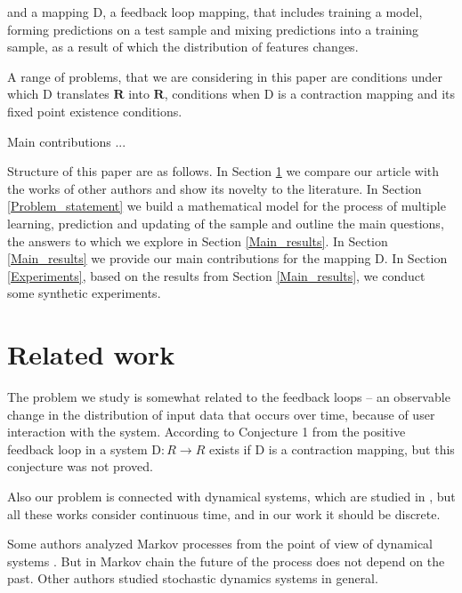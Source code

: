 \documentclass{article}
\begin{document}
    and a mapping $\text{D}$, a feedback loop mapping, that includes training a model, forming predictions on a test sample and mixing predictions into a training sample, as a result of which the distribution of features changes.

    A range of problems, that we are considering in this paper are conditions under which $\text{D}$ translates $\mathbf{R}$ into $\mathbf{R}$, conditions when $\text{D}$ is a contraction mapping and its fixed point existence conditions.

    Main contributions ...
    
    Structure of this paper are as follows. In Section \ref{Related_work} we compare our article with the works of other authors and show its novelty to the literature. In Section \ref{Problem_statement} we build a mathematical model for the process of multiple learning, prediction and updating of the sample and outline the main questions, the answers to which we explore in Section \ref{Main_results}. In Section \ref{Main_results} we provide our main contributions for the mapping $\text{D}$. In Section \ref{Experiments}, based on the results from Section \ref{Main_results}, we conduct some synthetic experiments.

\section{Related work} \label{Related_work}    

    The problem we study is somewhat related to the feedback loops \cite{khritankov2021hidden, khritankov2021existence} -- an observable change in the distribution of input data that occurs over time, because of user interaction with the system. According to Conjecture 1 from \cite{khritankov2021hidden} the positive feedback loop in a system $\text{D} : R \rightarrow R$ exists if $\text{D}$ is a contraction mapping, but this conjecture was not proved.

    Also our problem is connected with dynamical systems, which are studied in \cite{katok1995introduction, nemytskii2015qualitative}, but all these works consider continuous time, and in our work it should be discrete.

    Some authors analyzed Markov processes from the point of view of dynamical systems \cite{tarlowski2017global, vershik2005does}. But in Markov chain the future of the process does not depend on the past. Other authors \cite{varvenne2019rate, pap1996fixed} studied stochastic dynamics systems in general.
\end{document}
